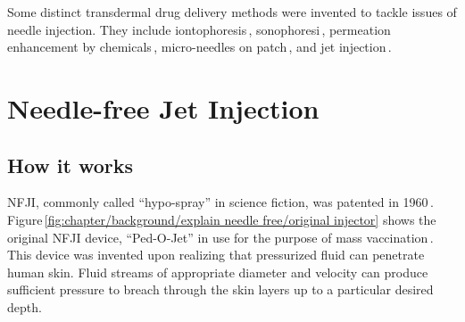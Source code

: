     Some distinct transdermal drug delivery methods were invented to tackle issues of needle injection. They include iontophoresis\,\cite{dhote2012}, sonophoresi\,\cite{bommanan1992}, permeation enhancement by chemicals\,\cite{karande2006}, micro-needles on patch\,\cite{cormier2004}, and jet injection\,\cite{taberner2006}. 

\section{Needle-free Jet Injection}                 \label{Chapter:background/needle-free jet injection}
    
    
    \subsection{How it works}                       \label{Chapter:background/needle-free jet injection/how it works}
    
        \ac{NFJI}, commonly called “hypo-spray” in science fiction, was patented in 1960\,\cite{ismach1962}. Figure\,\ref{fig:chapter/background/explain needle free/original injector} shows the original \acs{NFJI} device, “Ped-O-Jet” in use for the purpose of mass vaccination\,\cite{DictionnairesetEncyclopediessurAcademic}. This device was invented  upon realizing that pressurized fluid can penetrate human skin. Fluid streams of appropriate diameter and velocity can produce sufficient pressure to breach through the skin layers up to a particular desired depth. 
        
